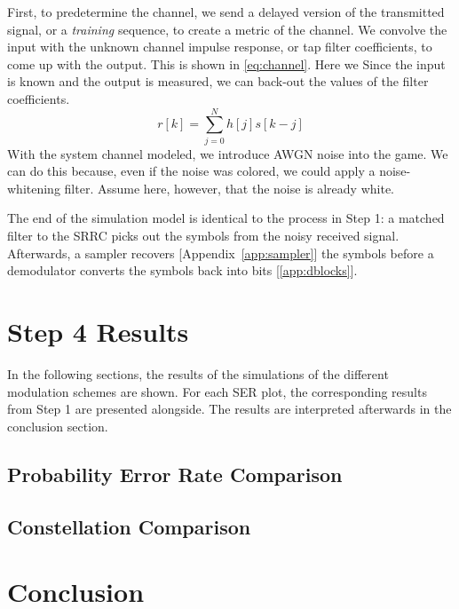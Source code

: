 \documentclass[]{article}
\begin{document}
First, to predetermine the channel, we send a delayed version of the transmitted signal, or a \emph{training} sequence, to create a metric of the channel.  We convolve the input with the unknown channel impulse response, or tap filter coefficients, to come up with the output.  This is shown in \ref{eq:channel}.  Here we  Since the input is known and the output is measured, we can back-out the values of the filter coefficients.  \\

\begin{equation}
\label{eq:channel}
r\left[k\right] = \sum_{j=0}^N h[j]s\left[k-j\right]
\end{equation}
With the system channel modeled, we introduce AWGN noise into the game.  We can do this because, even if the noise was colored, we could apply a noise-whitening filter.  Assume here, however, that the noise is already white.   



The end of the simulation model is identical to the process in Step 1: a matched filter to the SRRC picks out the symbols from the noisy received signal.  Afterwards, a sampler recovers [Appendix~\ref{app:sampler}] the symbols before a demodulator converts the symbols back into bits [\ref{app:dblocks}].  


\section{Step 4 Results}
\label{sec:results}
In the following sections, the results of the simulations of the different modulation schemes are shown.  For each SER plot, the corresponding results from Step 1 are presented alongside.  The results are interpreted afterwards in the conclusion section.

\newpage
\subsection{Probability Error Rate Comparison}
\label{sec:compare}

\newpage
\subsection{Constellation Comparison}
\label{sec:constCompare}

\newpage
\section{Conclusion}
\label{sec:conc}
\end{document}
